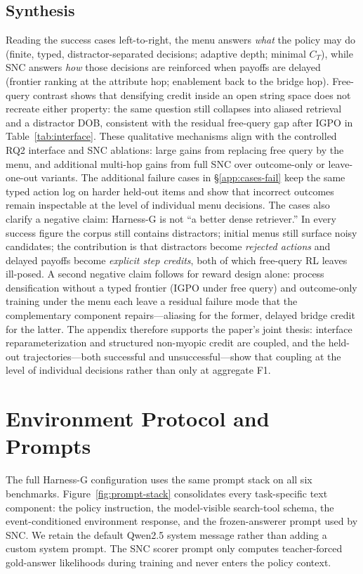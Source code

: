 \documentclass[letterpaper]{article} %
\begin{document}
\subsection{Synthesis}
\label{app:cases-synth}

Reading the success cases left-to-right, the menu answers \emph{what} the policy may do (finite, typed, distractor-separated decisions; adaptive depth; minimal $C_T$), while SNC answers \emph{how} those decisions are reinforced when payoffs are delayed (frontier ranking at the attribute hop; enablement back to the bridge hop).
Free-query contrast shows that densifying credit inside an open string space does not recreate either property: the same question still collapses into aliased retrieval and a distractor DOB, consistent with the residual free-query gap after IGPO in Table~\ref{tab:interface}.
These qualitative mechanisms align with the controlled RQ2 interface and SNC ablations: large gains from replacing free query by the menu, and additional multi-hop gains from full SNC over outcome-only or leave-one-out variants.
The additional failure cases in \S\ref{app:cases-fail} keep the same typed action log on harder held-out items and show that incorrect outcomes remain inspectable at the level of individual menu decisions.
The cases also clarify a negative claim: Harness-G is not ``a better dense retriever.''
In every success figure the corpus still contains distractors; initial menus still surface noisy candidates; the contribution is that distractors become \emph{rejected actions} and delayed payoffs become \emph{explicit step credits}, both of which free-query RL leaves ill-posed.
A second negative claim follows for reward design alone: process densification without a typed frontier (IGPO under free query) and outcome-only training under the menu each leave a residual failure mode that the complementary component repairs---aliasing for the former, delayed bridge credit for the latter.
The appendix therefore supports the paper's joint thesis: interface reparameterization and structured non-myopic credit are coupled, and the held-out trajectories---both successful and unsuccessful---show that coupling at the level of individual decisions rather than only at aggregate F1.

\section{Environment Protocol and Prompts}
\label{app:prompts}

The full Harness-G configuration uses the same prompt stack on all six benchmarks.
Figure~\ref{fig:prompt-stack} consolidates every task-specific text component: the policy instruction, the model-visible search-tool schema, the event-conditioned environment response, and the frozen-answerer prompt used by SNC.
We retain the default Qwen2.5 system message rather than adding a custom system prompt.
The SNC scorer prompt only computes teacher-forced gold-answer likelihoods during training and never enters the policy context.
\end{document}
